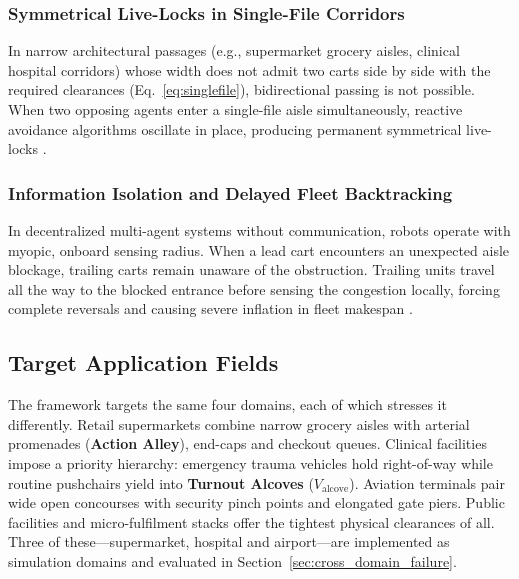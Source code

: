 \documentclass[journal]{IEEEtran}
\begin{document}
\subsubsection{Symmetrical Live-Locks in Single-File Corridors}
In narrow architectural passages (e.g., supermarket grocery aisles, clinical hospital corridors) whose width does not admit two carts side by side with the required clearances (Eq.~\eqref{eq:singlefile}), bidirectional passing is not possible. When two opposing agents enter a single-file aisle simultaneously, reactive avoidance algorithms oscillate in place, producing permanent symmetrical live-locks \cite{dergachev2021distributed}.

\subsubsection{Information Isolation and Delayed Fleet Backtracking}
In decentralized multi-agent systems without communication, robots operate with myopic, onboard sensing radius. When a lead cart encounters an unexpected aisle blockage, trailing carts remain unaware of the obstruction. Trailing units travel all the way to the blocked entrance before sensing the congestion locally, forcing complete reversals and causing severe inflation in fleet makespan \cite{gielis2022codesign}.

\subsection{Target Application Fields}
The framework targets the same four domains, each of which stresses it differently. Retail supermarkets combine narrow grocery aisles with arterial promenades (\textbf{Action Alley}), end-caps and checkout queues. Clinical facilities impose a priority hierarchy: emergency trauma vehicles hold right-of-way while routine pushchairs yield into \textbf{Turnout Alcoves} ($V_{\text{alcove}}$). Aviation terminals pair wide open concourses with security pinch points and elongated gate piers. Public facilities and micro-fulfilment stacks offer the tightest physical clearances of all. Three of these---supermarket, hospital and airport---are implemented as simulation domains and evaluated in Section~\ref{sec:cross_domain_failure}.
\end{document}
